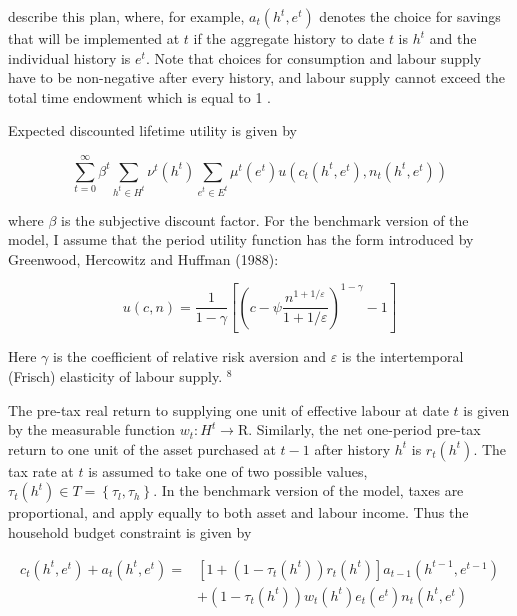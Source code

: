 \documentclass[11pt]{article}
\begin{document}
describe this plan, where, for example, $a_{t}\left(h^{t}, e^{t}\right)$ denotes the choice for savings that will be implemented at $t$ if the aggregate history to date $t$ is $h^{t}$ and the individual history is $e^{t}$. Note that choices for consumption and labour supply have to be non-negative after every history, and labour supply cannot exceed the total time endowment which is equal to 1 .

Expected discounted lifetime utility is given by


\begin{equation*}
\sum_{t=0}^{\infty} \beta^{t} \sum_{h^{t} \in H^{t}} \nu^{t}\left(h^{t}\right) \sum_{e^{t} \in E^{t}} \mu^{t}\left(e^{t}\right) u\left(c_{t}\left(h^{t}, e^{t}\right), n_{t}\left(h^{t}, e^{t}\right)\right) \tag{3.4}
\end{equation*}


where $\beta$ is the subjective discount factor. For the benchmark version of the model, I assume that the period utility function has the form introduced by Greenwood, Hercowitz and Huffman (1988):


\begin{equation*}
u(c, n)=\frac{1}{1-\gamma}\left[\left(c-\psi \frac{n^{1+1 / \varepsilon}}{1+1 / \varepsilon}\right)^{1-\gamma}-1\right] \tag{3.5}
\end{equation*}


Here $\gamma$ is the coefficient of relative risk aversion and $\varepsilon$ is the intertemporal (Frisch) elasticity of labour supply. ${ }^{8}$

The pre-tax real return to supplying one unit of effective labour at date $t$ is given by the measurable function $w_{t}: H^{t} \rightarrow \mathrm{R}$. Similarly, the net one-period pre-tax return to one unit of the asset purchased at $t-1$ after history $h^{t}$ is $r_{t}\left(h^{t}\right)$. The tax rate at $t$ is assumed to take one of two possible values, $\tau_{t}\left(h^{t}\right) \in T=\left\{\tau_{l}, \tau_{h}\right\}$. In the benchmark version of the model, taxes are proportional, and apply equally to both asset and labour income. Thus the household budget constraint is given by


\begin{align*}
c_{t}\left(h^{t}, e^{t}\right)+a_{t}\left(h^{t}, e^{t}\right)= & {\left[1+\left(1-\tau_{t}\left(h^{t}\right)\right) r_{t}\left(h^{t}\right)\right] a_{t-1}\left(h^{t-1}, e^{t-1}\right) } \\
& +\left(1-\tau_{t}\left(h^{t}\right)\right) w_{t}\left(h^{t}\right) e_{t}\left(e^{t}\right) n_{t}\left(h^{t}, e^{t}\right) \tag{3.6}
\end{align*}
\end{document}
